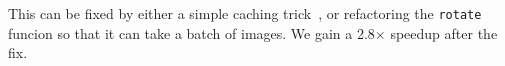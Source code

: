 This can be fixed by either a simple caching trick~\cite{della2015performance, nguyen2013cachetor}, or refactoring the {\tt rotate} funcion so that it can take a batch of images. We gain a 2.8$\times$ speedup after the fix.














